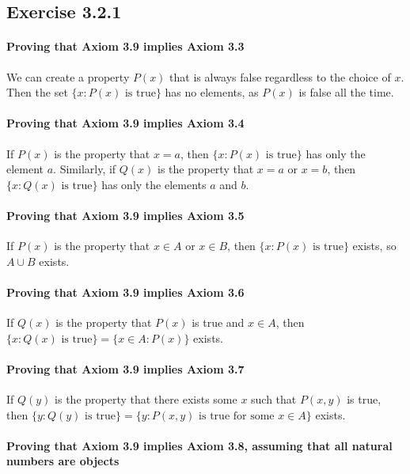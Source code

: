\documentclass[12pt, oneside]{book}
\begin{document}
	\subsection*{Exercise 3.2.1}
	
	\paragraph*{Proving that Axiom 3.9 implies Axiom 3.3}
	
	We can create a property $P(x)$ that is always false regardless to the choice of $x$. Then the set $\{x: P(x) \text{ is true}\}$ has no elements, as $P(x)$ is false all the time.
	
	\paragraph*{Proving that Axiom 3.9 implies Axiom 3.4}
	
	If $P(x)$ is the property that $x = a$, then $\{x: P(x) \text{ is true}\}$ has only the element $a$. Similarly, if $Q(x)$ is the property that $x = a$ or $x = b$, then $\{x: Q(x) \text{ is true}\}$ has only the elements $a$ and $b$.
	
	\paragraph*{Proving that Axiom 3.9 implies Axiom 3.5}
	
	If $P(x)$ is the property that $x \in A$ or $x \in B$, then $\{x: P(x) \text{ is true}\}$ exists, so $A \cup B$ exists.
	
	\paragraph*{Proving that Axiom 3.9 implies Axiom 3.6}
	
	If $Q(x)$ is the property that $P(x)$ is true and $x \in A$, then $\{x: Q(x) \text{ is true}\} = \{x \in A: P(x)\}$ exists.
	
	\paragraph*{Proving that Axiom 3.9 implies Axiom 3.7}
	
	If $Q(y)$ is the property that there exists some $x$ such that $P(x, y)$ is true, then $\{y: Q(y) \text{ is true}\} = \{y: P(x, y) \text{ is true for some } x \in A\}$ exists.
	
	\paragraph*{Proving that Axiom 3.9 implies Axiom 3.8, assuming that all natural numbers are objects}
	
\end{document}
